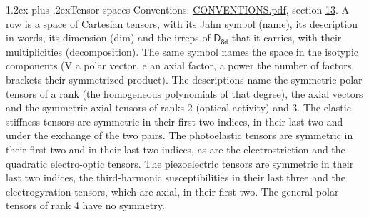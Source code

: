 \documentclass[10pt,a4paper]{article}
\makeatletter
\renewcommand\section{\@startsection{section}{1}{\z@}{-3ex plus -1ex minus -.2ex}%
  {1.2ex plus .2ex}{\normalfont\large\sffamily\bfseries\color{parttitle}}}
\numberwithin{equation}{section}
\newcommand{\grp}[1]{\mathsf{#1}}
\makeatother
\begin{document}
\section{Tensor spaces}\label{s:tensor_spaces}
Conventions: \href{../../CONVENTIONS.pdf}{CONVENTIONS.pdf}, section \href{../../CONVENTIONS.pdf\#conv.13}{13}.
\leavevmode\label{n:head.name}\label{n:head.description}\label{n:head.dim}\label{n:head.decomposition}A row is a space of Cartesian tensors, with its Jahn symbol (name), its description in words, its dimension (dim) and the irreps of $\grp{D_{8d}}$ that it carries, with their multiplicities (decomposition). \label{n:label.jahn}The same symbol names the space in the isotypic components (V a polar vector, e an axial factor, a power the number of factors, brackets their symmetrized product). The descriptions name the symmetric polar tensors of a rank (the homogeneous polynomials of that degree), the axial vectors and the symmetric axial tensors of ranks 2 (optical activity) and 3. The elastic stiffness tensors are symmetric in their first two indices, in their last two and under the exchange of the two pairs. The photoelastic tensors are symmetric in their first two and in their last two indices, as are the electrostriction and the quadratic electro-optic tensors. The piezoelectric tensors are symmetric in their last two indices, the third-harmonic susceptibilities in their last three and the electrogyration tensors, which are axial, in their first two. The general polar tensors of rank 4 have no symmetry.
\end{document}
